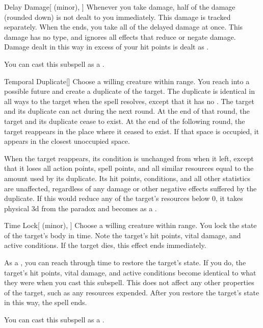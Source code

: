 \begin{ability}[\nth{4}]{Delay Damage}[ (minor), ]
Whenever you take damage, half of the damage (rounded down) is not dealt to you immediately.
This damage is tracked separately.
When the ends, you take all of the delayed damage at once.
This damage has no type, and ignores all effects that reduce or negate damage.
Damage dealt in this way in excess of your hit points is dealt as .

You can cast this subspell as a .
\end{ability}
\vspace{0.25em}


\begin{ability}[\nth{5}]{Temporal Duplicate}[]
Choose a willing creature within \rngmed range.
You reach into a possible future and create a duplicate of the target.
The duplicate is identical in all ways to the target when the spell resolves, except that it has no .
The target and its duplicate can act during the next round.
At the end of that round, the target and its duplicate cease to exist.
At the end of the following round, the target reappears in the place where it ceased to exist.
If that space is occupied, it appears in the closest unoccupied space.

When the target reappears, its condition is unchanged from when it left, except that it loses all action points, spell points, and all similar resources equal to the amount used by its duplicate.
Its hit points, conditions, and all other statistics are unaffected, regardless of any damage or other negative effects suffered by the duplicate.
If this would reduce any of the target's resources below 0, it takes physical  \plus3d from the paradox and becomes  as a .
\end{ability}
\vspace{0.25em}


\begin{ability}[\nth{6}]{Time Lock}[ (minor), ]
Choose a willing creature within \rngmed range.
You lock the state of the target's body in time.
Note the target's hit points, vital damage, and active conditions.
If the target dies, this effect ends immediately.

As a , you can reach through time to restore the target's state.
If you do, the target's hit points, vital damage, and active conditions become identical to what they were when you cast this subspell.
This does not affect any other properties of the target, such as any resources expended.
After you restore the target's state in this way, the spell ends.

You can cast this subspell as a .
\end{ability}
\vspace{0.25em}


